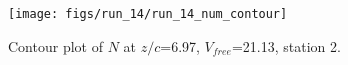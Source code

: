 \begin{figure}[H]
\centering
\texttt{[image: figs/run\_14/run\_14\_num\_contour]}
\caption{Contour plot of $N$ at $z/c$=6.97, $V_{free}$=21.13, station 2.}
\label{fig:run_14_num_contour}
\end{figure}


